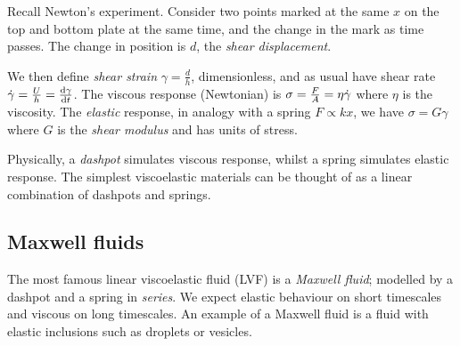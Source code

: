 \documentclass{jknotes}
\begin{document}
Recall Newton's experiment. Consider two points marked at the same $x$ on the
top and bottom plate at the same time, and the change in the mark as time
passes. The change in position is $d$, the \emph{shear displacement}.
\begin{center}
\end{center}

We then define \emph{shear strain} $\gamma = \frac{d}{h}$, dimensionless, and
as usual have shear rate $\srate = \frac{U}{h} = \frac{\diffd \gamma}{\diffd
t}$. The viscous response (Newtonian) is $\sigma = \frac{F}{A} = \eta \dot{\gamma}$
where $\eta$ is the viscosity. The \emph{elastic} response, in analogy with a
spring $F \propto kx$, we have $\sigma = G \gamma$ where $G$ is the
\emph{shear modulus} and has units of stress.

Physically, a \emph{dashpot} simulates viscous response, whilst a spring
simulates elastic response. The simplest viscoelastic materials can be thought
of as a linear combination of dashpots and springs.

\subsection{Maxwell fluids}
The most famous linear viscoelastic fluid (LVF) is a \emph{Maxwell fluid};
modelled by a dashpot and a spring in \emph{series}. We expect elastic
behaviour on short timescales and viscous on long timescales. An example of a
Maxwell fluid is a fluid with elastic inclusions such as droplets or vesicles.

\begin{center}
\end{center}
\end{document}
